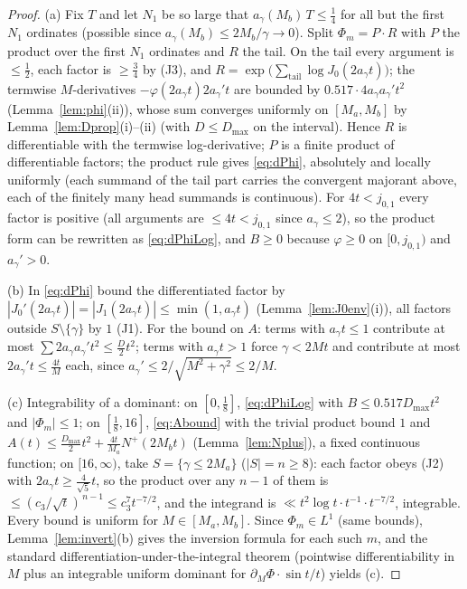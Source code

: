 \documentclass[11pt]{article}
\begin{document}
\begin{proof}
(a) Fix $T$ and let $N_1$ be so large that
$a_\gamma(M_b)\,T\le\tfrac14$ for all but the first $N_1$ ordinates
(possible since $a_\gamma(M_b)\le2M_b/\gamma\to0$). Split
$\Phi_m=P\cdot R$ with $P$ the product over the first $N_1$ ordinates
and $R$ the tail. On the tail every argument is $\le\tfrac12$, each
factor is $\ge\tfrac34$ by (J3), and
$R=\exp\bigl(\sum_{\mathrm{tail}}\log J_0(2a_\gamma t)\bigr)$; the
termwise $M$-derivatives $-\varphi(2a_\gamma t)2a_\gamma't$ are
bounded by $0.517\cdot4a_\gamma a_\gamma't^2$
(Lemma~\ref{lem:phi}(ii)), whose sum converges uniformly on
$[M_a,M_b]$ by Lemma~\ref{lem:Dprop}(i)--(ii) (with $D\le D_{\max}$
on the interval). Hence $R$ is differentiable with the termwise
log-derivative; $P$ is a finite product of differentiable factors;
the product rule gives \eqref{eq:dPhi}, absolutely and locally
uniformly (each summand of the tail part carries the convergent
majorant above, each of the finitely many head summands is
continuous). For $4t<j_{0,1}$ every factor is positive
(all arguments are $\le4t<j_{0,1}$ since $a_\gamma\le2$), so the
product form can be rewritten as \eqref{eq:dPhiLog}, and $B\ge0$
because $\varphi\ge0$ on $[0,j_{0,1})$ and $a_\gamma'>0$.

(b) In \eqref{eq:dPhi} bound the differentiated factor by
$|J_0'(2a_\gamma t)|=|J_1(2a_\gamma t)|\le\min(1,a_\gamma t)$
(Lemma~\ref{lem:J0env}(i)), all factors outside $S\setminus\{\gamma\}$
by $1$ (J1). For the bound on $A$: terms with $a_\gamma t\le1$
contribute at most $\sum2a_\gamma a_\gamma't^2\le\tfrac D2t^2$; terms
with $a_\gamma t>1$ force $\gamma<2Mt$ and contribute at most
$2a_\gamma't\le\tfrac{4t}M$ each, since $a_\gamma'\le
2/\sqrt{M^2+\gamma^2}\le2/M$.

(c) Integrability of a dominant: on $[0,\tfrac18]$,
\eqref{eq:dPhiLog} with $B\le0.517D_{\max}t^2$ and
$|\Phi_m|\le1$; on $[\tfrac18,16]$, \eqref{eq:Abound} with the
trivial product bound $1$ and
$A(t)\le\tfrac{D_{\max}}2t^2+\tfrac{4t}{M_a}N^+(2M_bt)$
(Lemma~\ref{lem:Nplus}), a fixed continuous function; on
$[16,\infty)$, take $S=\{\gamma\le2M_a\}$ ($|S|=n\ge8$): each factor
obeys (J2) with $2a_\gamma t\ge\tfrac4{\sqrt5}t$, so the product over
any $n-1$ of them is $\le(c_3/\sqrt t)^{\,n-1}\le c_3^{7}t^{-7/2}$,
and the integrand is $\ll t^{2}\log t\cdot t^{-1}\cdot t^{-7/2}$,
integrable. Every bound is uniform for $M\in[M_a,M_b]$. Since
$\Phi_m\in L^1$ (same bounds), Lemma~\ref{lem:invert}(b) gives the
inversion formula for each such $m$, and the standard
differentiation-under-the-integral theorem (pointwise
differentiability in $M$ plus an integrable uniform dominant for
$\partial_M\Phi\cdot\sin t/t$) yields (c).
\end{proof}
\end{document}
